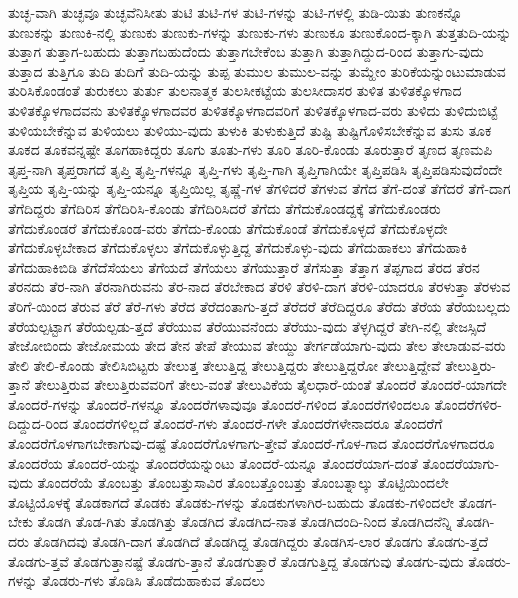 {ತುಚ್ಛ-ವಾಗಿ
ತುಚ್ಛವೂ
ತುಚ್ಛವೆನಿಸೀತು
ತುಟಿ
ತುಟಿ-ಗಳ
ತುಟಿ-ಗಳನ್ನು
ತುಟಿ-ಗಳಲ್ಲಿ
ತುಡಿ-ಯಿತು
ತುಣಕನ್ನೊ
ತುಣುಕನ್ನು
ತುಣುಕಿ-ನಲ್ಲಿ
ತುಣುಕು
ತುಣುಕು-ಗಳನ್ನು
ತುಣುಕು-ಗಳು
ತುಣುಕೂ
ತುಣುಕೊಂದ-ಕ್ಕಾಗಿ
ತುತ್ತತುದಿ-ಯನ್ನು
ತುತ್ತಾಗ
ತುತ್ತಾಗ-ಬಹುದು
ತುತ್ತಾಗಬಹುದೆಂದು
ತುತ್ತಾಗಬೇಕೆಂಬ
ತುತ್ತಾಗಿ
ತುತ್ತಾಗಿದ್ದುದ-ರಿಂದ
ತುತ್ತಾಗು-ವುದು
ತುತ್ತಾದ
ತುತ್ತಿಗೂ
ತುದಿ
ತುದಿಗೆ
ತುದಿ-ಯನ್ನು
ತುಪ್ಪ
ತುಮುಲ
ತುಮುಲ-ವನ್ನು
ತುಮ್ಹೇಂ
ತುರಿಕೆಯನ್ನುಂಟುಮಾಡುವ
ತುರಿಸಿಕೊಂಡಂತೆ
ತುರುಕಲು
ತುರ್ತು
ತುಲನಾತ್ಮಕ
ತುಲಸೀಕಟ್ಟೆಯ
ತುಲಸೀದಾಸರ
ತುಳಿತ
ತುಳಿತಕ್ಕೊಳಗಾದ
ತುಳಿತಕ್ಕೊಳಗಾದವನು
ತುಳಿತಕ್ಕೊಳಗಾದವರ
ತುಳಿತಕ್ಕೊಳಗಾದವರಿಗೆ
ತುಳಿತಕ್ಕೊಳಗಾದ-ವರು
ತುಳಿದು
ತುಳಿದುಬಿಟ್ಟೆ
ತುಳಿಯಬೇಕೆನ್ನುವ
ತುಳಿಯಲು
ತುಳಿಯು-ವುದು
ತುಳುಕಿ
ತುಳುಕುತ್ತಿದೆ
ತುಷ್ಟಿ
ತುಷ್ಟಿಗೊಳಿಸಬೇಕೆನ್ನುವ
ತುಸು
ತೂಕ
ತೂಕದ
ತೂಕವನ್ನಷ್ಟೇ
ತೂಗಹಾಕಿದ್ದರು
ತೂಗು
ತೂತು-ಗಳು
ತೂರಿ
ತೂರಿ-ಕೊಂಡು
ತೂರುತ್ತಾರೆ
ತೃಣದ
ತೃಣಮಪಿ
ತೃಪ್ತ-ನಾಗಿ
ತೃಪ್ತರಾಗದೆ
ತೃಪ್ತಿ
ತೃಪ್ತಿ-ಗಳನ್ನೂ
ತೃಪ್ತಿ-ಗಳು
ತೃಪ್ತಿ-ಗಾಗಿ
ತೃಪ್ತಿಗಾಗಿಯೇ
ತೃಪ್ತಿಪಡಿಸಿ
ತೃಪ್ತಿಪಡಿಸುವುದೆಂದೇ
ತೃಪ್ತಿಯ
ತೃಪ್ತಿ-ಯನ್ನು
ತೃಪ್ತಿ-ಯನ್ನೂ
ತೃಪ್ತಿಯಿಲ್ಲ
ತೃಷ್ಣೆ-ಗಳ
ತೆಗಳಿದರೆ
ತೆಗಳುವ
ತೆಗೆದ
ತೆಗೆ-ದಂತೆ
ತೆಗೆದರೆ
ತೆಗೆ-ದಾಗ
ತೆಗೆದಿದ್ದರು
ತೆಗೆದಿರಿಸ
ತೆಗೆದಿರಿಸಿ-ಕೊಂಡು
ತೆಗೆದಿರಿಸಿದರೆ
ತೆಗೆದು
ತೆಗೆದುಕೊಂಡದ್ದಕ್ಕೆ
ತೆಗೆದುಕೊಂಡರು
ತೆಗೆದುಕೊಂಡರೆ
ತೆಗೆದುಕೊಂಡ-ವರು
ತೆಗೆದು-ಕೊಂಡು
ತೆಗೆದುಕೊಂಡೆ
ತೆಗೆದುಕೊಳ್ಳದೆ
ತೆಗೆದುಕೊಳ್ಳದೇ
ತೆಗೆದುಕೊಳ್ಳಬೇಕಾದ
ತೆಗೆದುಕೊಳ್ಳಲು
ತೆಗೆದುಕೊಳ್ಳುತ್ತಿದ್ದ
ತೆಗೆದುಕೊಳ್ಳು-ವುದು
ತೆಗೆದುಹಾಕಲು
ತೆಗೆದುಹಾಕಿ
ತೆಗೆದುಹಾಕಿಬಿಡಿ
ತೆಗೆದೆಸೆಯಲು
ತೆಗೆಯದೆ
ತೆಗೆಯಲು
ತೆಗೆಯುತ್ತಾರೆ
ತೆಗೆಸುತ್ತಾ
ತೆತ್ತಾಗ
ತೆಪ್ಪಗಾದ
ತೆರದ
ತೆರನ
ತೆರನದು
ತೆರ-ನಾಗಿ
ತೆರನಾಗಿರುವನು
ತೆರ-ನಾದ
ತೆರಬೇಕಾದ
ತೆರಳಿ
ತೆರಳಿ-ದಾಗ
ತೆರಳಿ-ಯಾದರೂ
ತೆರಳುತ್ತಾ
ತೆರಳುವ
ತೆರಿಗೆ-ಯಿಂದ
ತೆರುವ
ತೆರೆ
ತೆರೆ-ಗಳು
ತೆರೆದ
ತೆರೆದಂತಾಗು-ತ್ತದೆ
ತೆರೆದರೆ
ತೆರೆದಿದ್ದರೂ
ತೆರೆದು
ತೆರೆಯ
ತೆರೆಯಬಲ್ಲದು
ತೆರೆಯಲ್ಪಟ್ಟಾಗ
ತೆರೆಯಲ್ಪಡು-ತ್ತದೆ
ತೆರೆಯುವ
ತೆರೆಯುವನೆಂದು
ತೆರೆಯು-ವುದು
ತೆಳ್ಳಗಿದ್ದರೆ
ತೇಗಿ-ನಲ್ಲಿ
ತೇಜಸ್ಸಿದೆ
ತೇಜೋಬಿಂದು
ತೇಜೋಮಯ
ತೇದ
ತೇನ
ತೇಪೆ
ತೇಯುವ
ತೇಯ್ದು
ತೇರ್ಗಡೆಯಾಗು-ವುದು
ತೇಲ
ತೇಲಾಡುವ-ವರು
ತೇಲಿ
ತೇಲಿ-ಕೊಂಡು
ತೇಲಿಸಿಬಿಟ್ಟರು
ತೇಲುತ್ತ
ತೇಲುತ್ತಿದ್ದ
ತೇಲುತ್ತಿದ್ದರು
ತೇಲುತ್ತಿದ್ದರೋ
ತೇಲುತ್ತಿದ್ದೇವೆ
ತೇಲುತ್ತಿರು-ತ್ತಾನೆ
ತೇಲುತ್ತಿರುವ
ತೇಲುತ್ತಿರುವವರಿಗೆ
ತೇಲು-ವಂತೆ
ತೇಲುವಿಕೆಯ
ತೈಲಧಾರೆ-ಯಂತೆ
ತೊಂದರೆ
ತೊಂದರೆ-ಯಾಗದೇ
ತೊಂದರೆ-ಗಳನ್ನು
ತೊಂದರೆ-ಗಳನ್ನೂ
ತೊಂದರೆಗಳಾವುವೂ
ತೊಂದರೆ-ಗಳಿಂದ
ತೊಂದರೆಗಳಿಂದಲೂ
ತೊಂದರೆಗಳಿರ-ದಿದ್ದುದ-ರಿಂದ
ತೊಂದರೆಗಳಿಲ್ಲದೆ
ತೊಂದರೆ-ಗಳು
ತೊಂದರೆ-ಗಳೇ
ತೊಂದರೆಗಳೇನಾದರೂ
ತೊಂದರೆಗೆ
ತೊಂದರೆಗೊಳಗಾಗಬೇಕಾಗುವು-ದಷ್ಟೆ
ತೊಂದರೆಗೊಳಗಾಗು-ತ್ತೇವೆ
ತೊಂದರೆ-ಗೊಳ-ಗಾದ
ತೊಂದರೆಗೊಳಗಾದರೂ
ತೊಂದರೆಯ
ತೊಂದರೆ-ಯನ್ನು
ತೊಂದರೆಯನ್ನುಂಟು
ತೊಂದರೆ-ಯನ್ನೂ
ತೊಂದರೆಯಾಗ-ದಂತೆ
ತೊಂದರೆಯಾಗು-ವುದು
ತೊಂದರೆಯೆ
ತೊಂಬತ್ತು
ತೊಂಬತ್ತುಸಾವಿರ
ತೊಂಬತ್ತೊಂಬತ್ತು
ತೊಂಬತ್ನಾಲ್ಕು
ತೊಟ್ಟಿಯಿಂದಲೇ
ತೊಟ್ಟಿಯೊಳಕ್ಕೆ
ತೊಡಕಾಗದೆ
ತೊಡಕು
ತೊಡಕು-ಗಳನ್ನು
ತೊಡಕುಗಳಾಗಿರ-ಬಹುದು
ತೊಡಕು-ಗಳಿಂದಲೇ
ತೊಡಗ-ಬೇಕು
ತೊಡಗಿ
ತೊಡ-ಗಿತು
ತೊಡಗಿತ್ತು
ತೊಡಗಿದ
ತೊಡಗಿದ-ನಾತ
ತೊಡಗಿದಂದಿ-ನಿಂದ
ತೊಡಗಿದನೆನ್ನಿ
ತೊಡಗಿ-ದರು
ತೊಡಗಿದವು
ತೊಡಗಿ-ದಾಗ
ತೊಡಗಿದೆ
ತೊಡಗಿದ್ದ
ತೊಡಗಿದ್ದರು
ತೊಡಗಿಸ-ಲಾರ
ತೊಡಗು
ತೊಡಗು-ತ್ತದೆ
ತೊಡಗು-ತ್ತವೆ
ತೊಡಗುತ್ತಾನಷ್ಟೆ
ತೊಡಗು-ತ್ತಾನೆ
ತೊಡಗುತ್ತಾರೆ
ತೊಡಗುತ್ತಿದ್ದ
ತೊಡಗುವು
ತೊಡಗು-ವುದು
ತೊಡರು-ಗಳನ್ನು
ತೊಡರು-ಗಳು
ತೊಡಿಸಿ
ತೊಡೆದುಹಾಕುವ
ತೊದಲು
}
